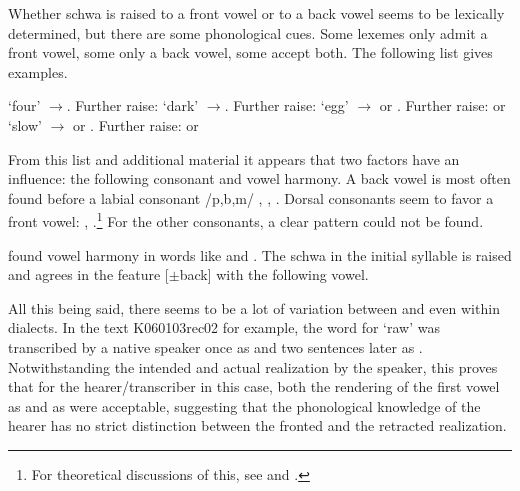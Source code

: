 Whether schwa is raised to a front vowel  or to a back vowel   seems to be lexically determined, but there are some phonological cues. Some lexemes only admit a front vowel, some only a back vowel, some accept both. The following list gives examples.

\ea {} `four' $\to$. Further raise:  \z
\ea {} `dark' $\to$. Further raise:  \z
\ea \phonem{\dentt@lOr} `egg' $\to$ or . Further raise:   or \z
\ea {} `slow' $\to$ or . Further raise:   or \z

From this list and additional material it appears that two factors have an influence: the following consonant and vowel harmony. A back vowel is most often found before a labial consonant /p,b,m/
,
,
 \citep[cf. ][27]{Adelaar1991}. Dorsal consonants seem to favor a front vowel:
,
.\footnote{For theoretical discussions of this, see \citet{Clements1990sonority} and \citet[99]{Botma2004}.}
For the other consonants, a clear pattern could not be found.

\citet{Bichsel} found vowel harmony in words like  and  \citep[also cf.][27]{Adelaar1991}.
The schwa in the initial syllable is raised and agrees in the feature [$\pm$back] with the following vowel.

All this being said, there seems to be a lot of variation between and even within dialects. In the text K060103rec02 for example, the word for `raw' was transcribed by a native speaker once as  and two sentences later as . Notwithstanding the intended and actual realization by the speaker, this proves that for the hearer/transcriber in this case, both the rendering of the first vowel as  and as  were acceptable, suggesting that the phonological knowledge of the hearer has no strict distinction between the fronted and the retracted realization.



